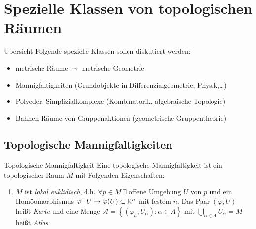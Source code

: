 \chapter{Spezielle Klassen von topologischen Räumen}

\begin{bla}{Übersicht}
  Folgende spezielle Klassen sollen diskutiert werden:
  \begin{itemize}
    \item metrische Räume $ \leadsto $ metrische Geometrie
    \item Mannigfaltigkeiten (Grundobjekte in Differenzialgeometrie, Physik,\dots)
    \item Polyeder, Simplizialkomplexe (Kombinatorik, algebraische Topologie)
    \item Bahnen-Räume von Gruppenaktionen (geometrische Gruppentheorie)
  \end{itemize}
\end{bla}

\section{Topologische Mannigfaltigkeiten}

\begin{definition}{Topologische Mannigfaltigkeit}
  Eine topologische Mannigfaltigkeit ist ein topologischer Raum $ M $ mit Folgenden Eigenschaften:
  \begin{enumerate}
    \item $ M $ ist \emph{lokal euklidisch}, d.h. $ \forall p \in M \ \exists $ offene Umgebung $ U $ von $ p $ und ein Homöomorphismus $ \varphi: U \to \varphi(U) \subset \mathbb{R}^n $ mit festem $ n $. Das Paar $ (\varphi, U) $ heißt \emph{Karte} und eine Menge $ \mathcal{A} = \left\{ (\varphi_a, U_\alpha) : \alpha \in A \right\} $ mit $ \bigcup_{\alpha \in A}U_\alpha = M $ heißt \emph{Atlas}.
  \end{enumerate}
\end{definition}